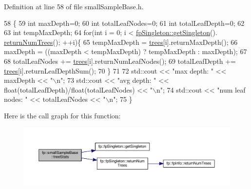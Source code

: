 Definition at line 58 of file small\+Sample\+Base.\+h.


\begin{DoxyCode}
58                             \{
59                 \textcolor{keywordtype}{int} maxDepth=0;
60                 \textcolor{keywordtype}{int} totalLeafNodes=0;
61                 \textcolor{keywordtype}{int} totalLeafDepth=0;
62 
63                 \textcolor{keywordtype}{int} tempMaxDepth;
64                 \textcolor{keywordflow}{for}(\textcolor{keywordtype}{int} i = 0; i < \hyperlink{classfp_1_1fpSingleton_a8bdae77b68521003e3fc630edec2e240}{fpSingleton::getSingleton}().
      \hyperlink{classfp_1_1fpSingleton_a8be36616345b6b77ce4c60b99cc2b91c}{returnNumTrees}(); ++i)\{
65                     tempMaxDepth = \hyperlink{classfp_1_1smallSampleBase_a9a3d92948248f1809d9f025b553512b6}{trees}[i].returnMaxDepth();
66                     maxDepth = ((maxDepth < tempMaxDepth) ? tempMaxDepth : maxDepth);
67 
68                     totalLeafNodes += \hyperlink{classfp_1_1smallSampleBase_a9a3d92948248f1809d9f025b553512b6}{trees}[i].returnNumLeafNodes();
69                     totalLeafDepth += \hyperlink{classfp_1_1smallSampleBase_a9a3d92948248f1809d9f025b553512b6}{trees}[i].returnLeafDepthSum();
70                 \}
71 
72                 std::cout << \textcolor{stringliteral}{"max depth: "} << maxDepth << \textcolor{stringliteral}{"\(\backslash\)n"};
73                 std::cout << \textcolor{stringliteral}{"avg depth: "} << float(totalLeafDepth)/float(totalLeafNodes) << \textcolor{stringliteral}{"\(\backslash\)n"};
74                 std::cout << \textcolor{stringliteral}{"num leaf nodes: "} << totalLeafNodes << \textcolor{stringliteral}{"\(\backslash\)n"};
75             \}
\end{DoxyCode}
Here is the call graph for this function\+:\nopagebreak
\begin{figure}[H]
\begin{center}
\leavevmode
\includegraphics[width=350pt]{classfp_1_1smallSampleBase_acc948b260715a190675a5d5ebedf0429_cgraph}
\end{center}
\end{figure}


